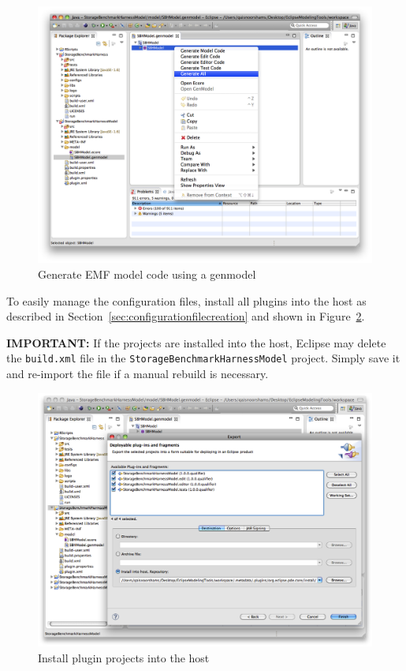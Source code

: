 \begin{figure}[htbp]
	\centering
	\includegraphics[scale=0.375]{graphics/example/Generate.png}
	\caption{Generate EMF model code using a genmodel}
 	\label{fig:ExampleGenerate}
\end{figure}

To easily manage the configuration files, install all plugins into the host as described in Section~\ref{sec:configurationfilecreation} and shown in Figure~\ref{fig:ExamplePlugins}.

\textbf{IMPORTANT:} If the projects are installed into the host, Eclipse may delete the \texttt{build.xml} file in the \texttt{StorageBenchmarkHarnessModel} project. Simply save it and re-import the file if a manual rebuild is necessary.

\begin{figure}[htbp]
	\centering
	\includegraphics[scale=0.375]{graphics/example/Plugins.png}
	\caption{Install plugin projects into the host}
 	\label{fig:ExamplePlugins}
\end{figure}

